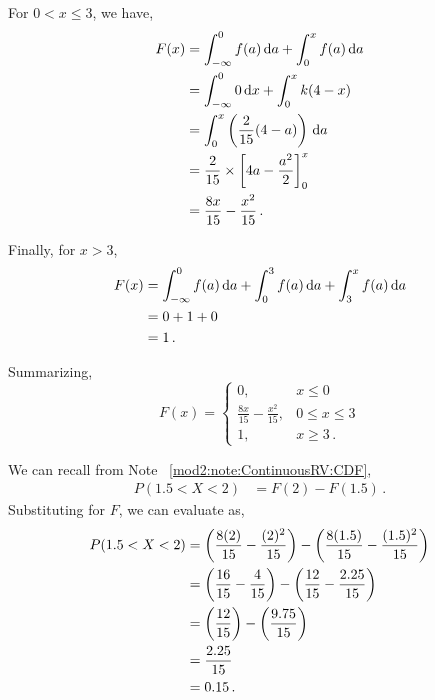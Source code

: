 \begin{subquestions}
\begin{subsubquestions}
For $0 < x \leq 3$, we have,
\begin{align}
	F(x) &= \int_{-\infty}^{0} f(a)\,\mathrm{d} a + \int_0^x f(a) \,\mathrm{d} a\nonumber\\
		&= \int_{-\infty}^0 0 \,\mathrm{d} x + \int_0^x k(4-x) \nonumber\\
		& = \int_{0}^{x}\left( \frac{2}{15}(4-a)\right)\,\mathrm{d} a\nonumber \\
	                                  & = \frac{2}{15} \times \left[4a - \frac{a^2}{2} \right]^x_0 \nonumber \\
	                                  & = \frac{8x}{15} - \frac{x^2}{15} \,.
\end{align}

Finally, for $x >3$,
\begin{align}
	F(x) &= \int_{-\infty}^{0} f(a)\,\mathrm{d} a + \int_0^3 f(a) \,\mathrm{d} a+ \int_3^x f(a) \,\mathrm{d} a\nonumber\\
	&= 0 + 1 + 0 \nonumber\\
	&=1 \,.	
\end{align}


Summarizing,
\begin{equation}
F(x) =
\begin{cases} 
	0, & x \leq 0 \\
	\frac{8x}{15} - \frac{x^2}{15}, & 0 \leq x \leq 3 \\
	1, & x \geq 3 \,.
\end{cases}
\end{equation}
	


\subsubquestion

We can recall from Note ~\ref{mod2:note:ContinuousRV:CDF}, 
\begin{align}
		P( 1.5 < X < 2) & = F(2) - F(1.5) \,.
\end{align}
Substituting for $F$, we can evaluate as,
\begin{align}
		P( 1.5 < X < 2) & = \left(\frac{8(2)}{15} - \frac{(2)^2}{15}\right) - \left(\frac{8(1.5)}{15} - \frac{(1.5)^2}{15}\right) \nonumber \\
		                & = \left(\frac{16}{15} - \frac{4}{15}\right) - \left(\frac{12}{15} - \frac{2.25}{15}\right) \nonumber \\
		                & = \left(\frac{12}{15}\right) - \left(\frac{9.75}{15} \right) \nonumber \\
		                & = \frac{2.25}{15} \nonumber \\
		                & = 0.15 \,.
\end{align}

\end{subsubquestions}
	
	
\end{subquestions}

